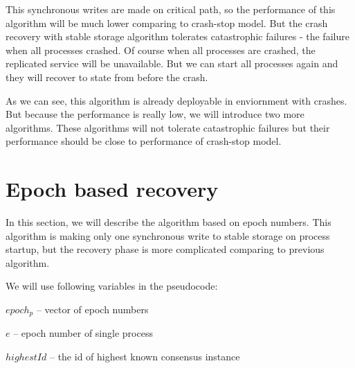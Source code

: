 This synchronous writes are made on critical path, so the performance of this algorithm will be much lower comparing to crash-stop model. But the crash recovery with stable storage algorithm tolerates catastrophic failures - the failure when all processes crashed. Of course when all processes are crashed, the replicated service will be unavailable. But we can start all processes again and they will recover to state from before the crash.

As we can see, this algorithm is already deployable in enviornment with crashes. But because the performance is really low, we will introduce two more algorithms. These algorithms will not tolerate catastrophic failures but their performance should be close to performance of crash-stop model.

\section{Epoch based recovery}
\label{sec:epoch_ss}

In this section, we will describe the algorithm based on epoch numbers. This algorithm is making only one synchronous write to stable storage on process startup, but the recovery phase is more complicated comparing to previous algorithm.

We will use following variables in the pseudocode:
\begin{tightList}[\setlength{\labelwidth}{20em} \setlength{\leftmargin}{3\leftmargin}]
  \item[$epoch_p$] -- vector of epoch numbers
  \item[$e$] -- epoch number of single process
  \item[$highestId$] -- the id of highest known consensus instance
\end{tightList}

